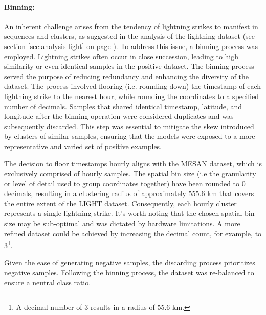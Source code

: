 \paragraph{Binning:}
\label{sec:preprocessing-light-binning}
An inherent challenge arises from the tendency of lightning strikes to manifest in sequences and clusters, as suggested in the analysis of the lightning dataset (see section \ref{sec:analysis-light} on page \pageref{sec:analysis-light}). To address this issue, a binning process was employed. Lightning strikes often occur in close succession, leading to high similarity or even identical samples in the positive dataset. The binning process served the purpose of reducing redundancy and enhancing the diversity of the dataset. The process involved flooring (i.e. rounding down) the timestamp of each lightning strike to the nearest hour, while rounding the coordinates to a specified number of decimals. Samples that shared identical timestamp, latitude, and longitude after the binning operation were considered duplicates and was subsequently discarded. This step was essential to mitigate the skew introduced by clusters of similar samples, ensuring that the models were exposed to a more representative and varied set of positive examples.

The decision to floor timestamps hourly aligns with the MESAN dataset, which is exclusively comprised of hourly samples. The spatial bin size (i.e the granularity or level of detail used to group 
coordinates together) have been rounded to 0 decimals, resulting in a clustering radius of approximately 555.6 km that covers the entire extent of the LIGHT dataset. Consequently, each hourly cluster represents a single lightning strike. It's worth noting that the chosen spatial bin size may be sub-optimal and was dictated by hardware limitations. A more refined dataset could be achieved by increasing the decimal count, for example, to 3\footnote{A decimal number of 3 results in a radius of 55.6 km.}.

Given the ease of generating negative samples, the discarding process prioritizes negative samples. Following the binning process, the dataset was re-balanced to ensure a neutral class ratio.


